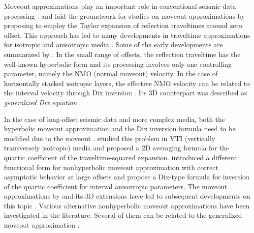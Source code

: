 Moveout approximations play an important role in conventional seismic data processing \cite[]{yilmaz}. \cite{bolshix} and \cite{taner} laid the groundwork for studies on moveout approximations by proposing to employ the Taylor expansion of reflection traveltimes around zero offset. This approach has led to many developments in traveltime approximations for isotropic and anisotropic media \cite[]{malovichko,hake,sena,tsvankinthomsen1994,alkatsvankin,alhti,alkavti,alortho,nmoellipse,taner2005,ursin,blias2009,fomelstovas,aleixo,golikov,stovasortho}. Some of the early developments are summarized by \cite{castle}. In the small range of offsets, the reflection traveltime has the well-known hyperbolic form and its processing involves only one controlling parameter, namely the NMO (normal moveout) velocity. In the case of horizontally stacked isotropic layers, the effective NMO velocity can be related to the interval velocity through Dix inversion \cite[]{dix}. Its 3D counterpart was described as \textit{generalized Dix equation} \cite[]{nmoellipse,grechkatsvankinortho,tsvankin2011book}

In the case of long-offset seismic data and more complex media, both the hyperbolic moveout approximation and the Dix inversion formula need to be modified due to the moveout  \cite[]{fomelnonhyper}. \cite{hake} studied this problem in VTI (vertically transversely isotropic) media and proposed a 2D averaging formula for the quartic coefficient of the traveltime-squared expansion. \cite{tsvankinthomsen1994} introduced a different functional form for nonhyperbolic moveout approximation with correct asymptotic behavior at large offsets and propose a Dix-type formula for inversion of the quartic coefficient for interval anisotropic parameters. The moveout approximations by \cite{tsvankinthomsen1994} and its 3D extensions have led to subsequent developments on this topic \cite[]{alkatsvankin,alhti,alortho,pech2003,pech2004,xu}. Various alternative nonhyperbolic moveout approximations have been investigated in the literature. Several of them can be related to the generalized moveout approximation \cite[]{fomelstovas,zonegma,zonegmapaper}.

